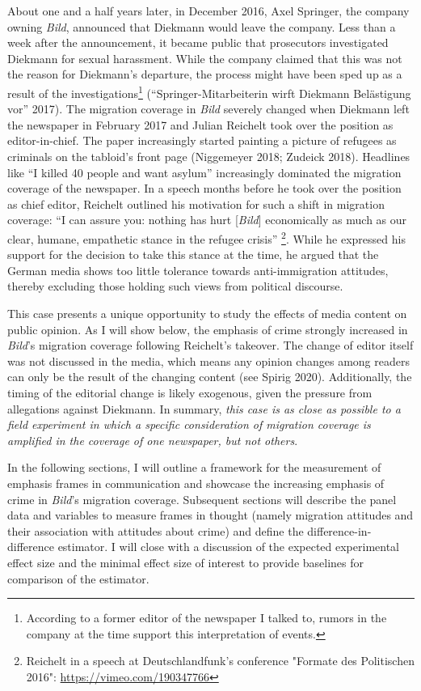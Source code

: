 \documentclass[
  12pt,
]{article}
\begin{document}
About one and a half years later, in December 2016, Axel Springer, the company owning \emph{Bild}, announced that Diekmann would leave the company. Less than a week after the announcement, it became public that prosecutors investigated Diekmann for sexual harassment. While the company claimed that this was not the reason for Diekmann's departure, the process might have been sped up as a result of the investigations\footnote{According to a former editor of the newspaper I talked to, rumors in the company at the time support this interpretation of events.} ({``{Springer-Mitarbeiterin wirft Diekmann Bel{ä}stigung vor}''} 2017). The migration coverage in \emph{Bild} severely changed when Diekmann left the newspaper in February 2017 and Julian Reichelt took over the position as editor-in-chief. The paper increasingly started painting a picture of refugees as criminals on the tabloid's front page (Niggemeyer 2018; Zudeick 2018). Headlines like ``I killed 40 people and want asylum'' increasingly dominated the migration coverage of the newspaper. In a speech months before he took over the position as chief editor, Reichelt outlined his motivation for such a shift in migration coverage: ``I can assure you: nothing has hurt {[}\emph{Bild}{]} economically as much as our clear, humane, empathetic stance in the refugee crisis'' \footnote{Reichelt in a speech at Deutschlandfunk's conference "Formate des Politischen 2016": \url{https://vimeo.com/190347766}}. While he expressed his support for the decision to take this stance at the time, he argued that the German media shows too little tolerance towards anti-immigration attitudes, thereby excluding those holding such views from political discourse.

This case presents a unique opportunity to study the effects of media content on public opinion. As I will show below, the emphasis of crime strongly increased in \emph{Bild}'s migration coverage following Reichelt's takeover. The change of editor itself was not discussed in the media, which means any opinion changes among readers can only be the result of the changing content (see Spirig 2020). Additionally, the timing of the editorial change is likely exogenous, given the pressure from allegations against Diekmann. In summary, \emph{this case is as close as possible to a field experiment in which a specific consideration of migration coverage is amplified in the coverage of one newspaper, but not others}.

In the following sections, I will outline a framework for the measurement of emphasis frames in communication and showcase the increasing emphasis of crime in \emph{Bild}'s migration coverage. Subsequent sections will describe the panel data and variables to measure frames in thought (namely migration attitudes and their association with attitudes about crime) and define the difference-in-difference estimator. I will close with a discussion of the expected experimental effect size and the minimal effect size of interest to provide baselines for comparison of the estimator.
\end{document}
